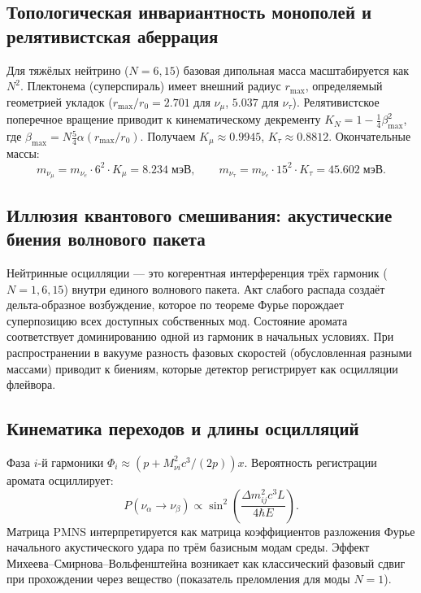 \documentclass[11pt,a4paper]{article}
\begin{document}
	\subsection{Топологическая инвариантность монополей и релятивистская аберрация}
	Для тяжёлых нейтрино ($N=6,15$) базовая дипольная масса масштабируется как $N^2$. Плектонема (суперспираль) имеет внешний радиус $r_{\text{max}}$, определяемый геометрией укладок ($r_{\text{max}}/r_0=2.701$ для $\nu_\mu$, $5.037$ для $\nu_\tau$). Релятивистское поперечное вращение приводит к кинематическому декременту $K_N = 1-\frac14\beta_{\text{max}}^2$, где $\beta_{\text{max}} = N\frac{5}{4}\alpha (r_{\text{max}}/r_0)$. Получаем $K_\mu\approx0.9945$, $K_\tau\approx0.8812$. Окончательные массы:
	\begin{equation}
		m_{\nu_\mu}=m_{\nu_e}\cdot 6^2\cdot K_\mu = 8.234\;\text{мэВ},\qquad
		m_{\nu_\tau}=m_{\nu_e}\cdot 15^2\cdot K_\tau = 45.602\;\text{мэВ}.
	\end{equation}
	
	\subsection{Иллюзия квантового смешивания: акустические биения волнового пакета}
	Нейтринные осцилляции — это когерентная интерференция трёх гармоник ($N=1,6,15$) внутри единого волнового пакета. Акт слабого распада создаёт дельта-образное возбуждение, которое по теореме Фурье порождает суперпозицию всех доступных собственных мод. Состояние аромата соответствует доминированию одной из гармоник в начальных условиях. При распространении в вакууме разность фазовых скоростей (обусловленная разными массами) приводит к биениям, которые детектор регистрирует как осцилляции флейвора.
	
	\subsection{Кинематика переходов и длины осцилляций}
	Фаза $i$-й гармоники $\Phi_i \approx (p + M_{\nu i}^2 c^3/(2p))x$. Вероятность регистрации аромата осциллирует:
	\begin{equation}
		P(\nu_\alpha\to\nu_\beta) \propto \sin^2\!\left(\frac{\Delta m_{ij}^2 c^3 L}{4\hbar E}\right).
	\end{equation}
	Матрица PMNS интерпретируется как матрица коэффициентов разложения Фурье начального акустического удара по трём базисным модам среды. Эффект Михеева–Смирнова–Вольфенштейна возникает как классический фазовый сдвиг при прохождении через вещество (показатель преломления для моды $N=1$).
	
\end{document}
